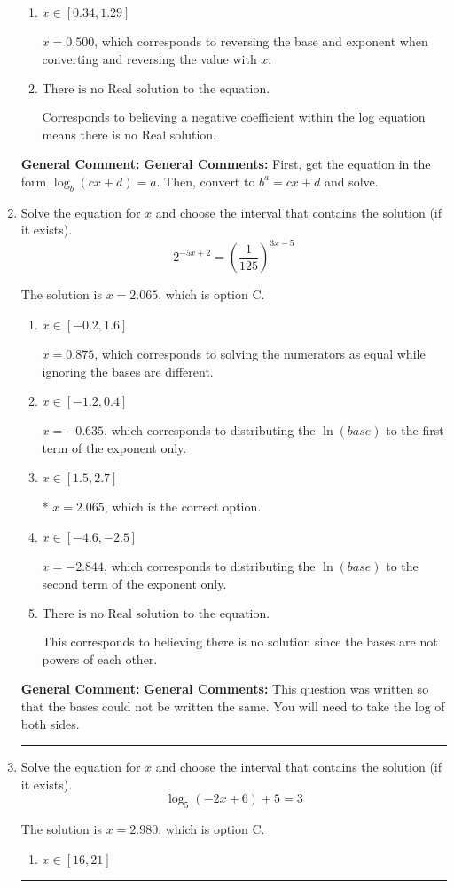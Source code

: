 \documentclass{extbook}[14pt]
\newcommand{\litem}[1]{\item #1

\rule{\textwidth}{0.4pt}}
\begin{document}
\begin{enumerate}
{\begin{enumerate}[label=\Alph*.]
* $x = 1.472$, which is the correct option.
\item \( x \in [0.34, 1.29] \)

$x = 0.500$, which corresponds to reversing the base and exponent when converting and reversing the value with $x$.
\item \( \text{There is no Real solution to the equation.} \)

Corresponds to believing a negative coefficient within the log equation means there is no Real solution.
\end{enumerate}

\textbf{General Comment:} \textbf{General Comments:} First, get the equation in the form $\log_b{(cx+d)} = a$. Then, convert to $b^a = cx+d$ and solve.
}
\litem{
Solve the equation for $x$ and choose the interval that contains the solution (if it exists).
\[ 2^{-5x+2} = \left(\frac{1}{125}\right)^{3x-5} \]

The solution is \( x = 2.065 \), which is option C.\begin{enumerate}[label=\Alph*.]
\item \( x \in [-0.2, 1.6] \)

$x = 0.875$, which corresponds to solving the numerators as equal while ignoring the bases are different.
\item \( x \in [-1.2, 0.4] \)

$x = -0.635$, which corresponds to distributing the $\ln(base)$ to the first term of the exponent only.
\item \( x \in [1.5, 2.7] \)

* $x = 2.065$, which is the correct option.
\item \( x \in [-4.6, -2.5] \)

$x = -2.844$, which corresponds to distributing the $\ln(base)$ to the second term of the exponent only.
\item \( \text{There is no Real solution to the equation.} \)

This corresponds to believing there is no solution since the bases are not powers of each other.
\end{enumerate}

\textbf{General Comment:} \textbf{General Comments:} This question was written so that the bases could not be written the same. You will need to take the log of both sides.
}
\litem{
Solve the equation for $x$ and choose the interval that contains the solution (if it exists).
\[ \log_{5}{(-2x+6)}+5 = 3 \]

The solution is \( x = 2.980 \), which is option C.\begin{enumerate}[label=\Alph*.]
\item \( x \in [16, 21] \)


\end{enumerate}}
\end{enumerate}
\end{document}
